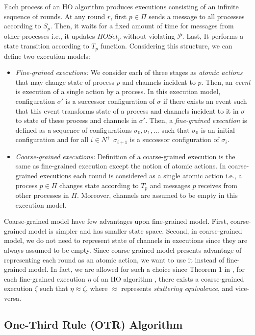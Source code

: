 \documentclass{llncs}
\begin{document}
Each process of an HO algorithm produces executions consisting of an infinite sequence of rounds. At any round $r$, first $p \in \Pi$ sends a message to all processes according to $S_p$. Then, it waits for a fixed amount of time for messages from other processes i.e., it updates $HOSet_p$ without violating $\mathcal{P}$. Last, It performs a state transition according to $T_p$ function. Considering this structure, we can define two execution models:
\begin{itemize}
\item \emph{Fine-grained executions:} We consider each of three stages as \emph{atomic actions} that may change state of process $p$ and channels incident to $p$. Then, an \emph{event} is execution of a single action by a process. In this execution model, configuration $\sigma'$ is a successor configuration of $\sigma$ if there exists an event such that this event transforms state of a process and channels incident to it in $\sigma$ to state of these process and channels in $\sigma'$. Then, a \emph{fine-grained execution} is defined as a sequence of configurations $\sigma_0,\sigma_1,...$ such that $\sigma_0$ is an initial configuration and for all $i\in N^+$ $\sigma_{i+1}$ is a successor configuration of $\sigma_i$. 
\item \emph{Coarse-grained executions:} Definition of a coarse-grained execution is the same as fine-grained execution except the notion of atomic actions. In coarse-grained executions each round is considered as a single atomic action i.e., a process $p\in \Pi$ changes state according to $T_p$ and messages $p$ receives from other processes in $\Pi$. Moreover, channels are assumed to be empty in this execution model.
\end{itemize}
Coarse-grained model have few advantages upon fine-grained model. First, coarse-grained model is simpler and has smaller state space. Second, in coarse-grained model, we do not need to represent state of channels in executions since they are always assumed to be empty.
Since coarse-grained model presents advantage of representing each round as an atomic action, we want to use it instead of fine-grained model. In fact, we are allowed for such a choice since Theorem 1 in \cite{charron11}, for each fine-grained execution $\eta$ of an HO algorithm , there exists a coarse-grained execution $\zeta$ such that $\eta \approx \zeta$, where $\approx$ represents \emph{stuttering equivalence}, and vice-versa.

\subsection{One-Third Rule (OTR) Algorithm}
\end{document}
